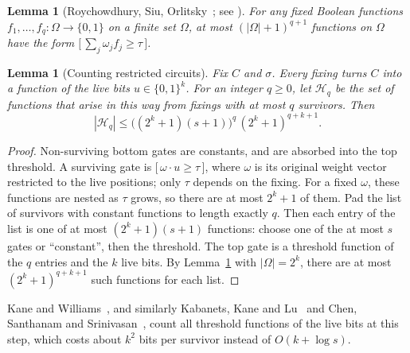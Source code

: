 \documentclass[11pt,letterpaper]{article}
\newtheorem{lemma}[theorem]{Lemma}
\theoremstyle{remark}
\newcommand{\bits}{\{0,1\}}
\newcommand{\ind}[1]{\bigl[\,#1\,\bigr]}
\newcommand{\cH}{\mathcal H}
\begin{document}
\begin{lemma}[Roychowdhury, Siu, Orlitsky~\cite{RSO}; see {\cite[Thm.~2.3]{KW}}]\label{fact:rso}
For any fixed Boolean functions $f_1,\dots,f_q:\Omega\to\bits$ on a finite
set $\Omega$, at most
$(|\Omega|+1)^{q+1}$ functions on $\Omega$ have the form
$\ind{\sum_j\omega_jf_j\ge\tau}$.
\end{lemma}

\begin{lemma}[Counting restricted circuits]\label{lem:count}
Fix $C$ and $\sigma$. Every fixing turns $C$ into a function of the live
bits $u\in\bits^k$. For an integer $q\ge0$, let $\cH_q$ be the set of
functions that arise in this way from fixings with at most $q$ survivors. Then
\[
|\cH_q|\le\bigl((2^k+1)(s+1)\bigr)^q\,(2^k+1)^{q+k+1}.
\]
\end{lemma}
\begin{proof}
Non-surviving bottom gates are constants, and are absorbed into the top
threshold. A surviving gate is $\ind{\omega\cdot u\ge\tau}$, where $\omega$ is
its original weight vector restricted to the live positions; only $\tau$
depends on the fixing. For a fixed $\omega$, these functions are nested as
$\tau$ grows, so there are at most $2^k+1$ of them. Pad the list of survivors
with constant functions to length exactly $q$. Then each entry of the list is
one of at most $(2^k+1)(s+1)$ functions: choose one of the at most $s$ gates
or ``constant'', then the threshold. The top gate is a threshold function of
the $q$ entries and the $k$ live bits. By Lemma~\ref{fact:rso} with
$|\Omega|=2^k$, there are at most $(2^k+1)^{q+k+1}$ such functions for each
list.
\end{proof}
Kane and Williams~\cite{KW}, and similarly Kabanets, Kane and Lu~\cite{KKL}
and Chen, Santhanam and Srinivasan~\cite{CSS}, count all threshold
functions of the live bits at this step, which costs about $k^2$ bits per
survivor instead of $O(k+\log s)$.
\end{document}

